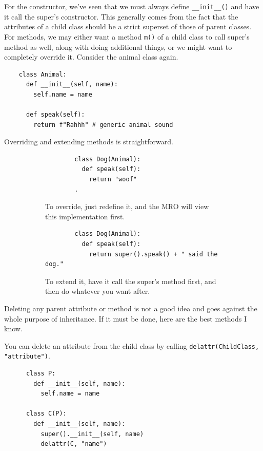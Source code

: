   For the constructor, we've seen that we must always define \texttt{\_\_init\_\_()} and have it call the super's constructor. This generally comes from the fact that the attributes of a child class should be a strict superset of those of parent classes. For methods, we may either want a method \texttt{m()} of a child class to call super's method as well, along with doing additional things, or we might want to completely override it. Consider the animal class again. 
  \begin{lstlisting}
    class Animal: 
      def __init__(self, name):
        self.name = name
      
      def speak(self):
        return f"Rahhh" # generic animal sound
  \end{lstlisting} 

  Overriding and extending methods is straightforward. 

  \begin{figure}[H]
    \centering
    \begin{subfigure}[b]{0.48\textwidth}
      \centering
      \begin{lstlisting}
        class Dog(Animal): 
          def speak(self): 
            return "woof"
        .
      \end{lstlisting}
      \caption{To override, just redefine it, and the MRO will view this implementation first.}
    \end{subfigure}
    \hfill 
    \begin{subfigure}[b]{0.48\textwidth}
      \centering
      \begin{lstlisting}
        class Dog(Animal): 
          def speak(self): 
            return super().speak() + " said the dog."
      \end{lstlisting}
      \caption{To extend it, have it call the super's method first, and then do whatever you want after. }
    \end{subfigure}
    \caption{}
  \end{figure}

  Deleting any parent attribute or method is not a good idea and goes against the whole purpose of inheritance. If it must be done, here are the best methods I know. 

  \begin{theorem}
    \label{thm:deleting-attribute-belonging-to-parent-in-child}
    You can delete an attribute from the child class by calling \texttt{delattr(ChildClass, "attribute")}. 
    \begin{lstlisting}
      class P: 
        def __init__(self, name): 
          self.name = name  

      class C(P): 
        def __init__(self, name): 
          super().__init__(self, name) 
          delattr(C, "name") 
    \end{lstlisting}
  \end{theorem}

